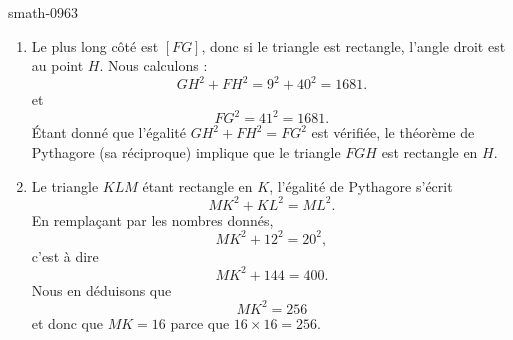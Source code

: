 
\begin{corrige}{smath-0963}

    \begin{enumerate}
        \item
            Le plus long côté est \( [FG]\), donc si le triangle est rectangle, l'angle droit est au point \( H\). Nous calculons :
            \begin{equation}
                GH^2+FH^2=9^2+40^2=1681.
            \end{equation}
            et
            \begin{equation}
                FG^2=41^2=1681.
            \end{equation}
            Étant donné que l'égalité \( GH^2+FH^2=FG^2\) est vérifiée, le théorème de Pythagore (sa réciproque) implique que le triangle \( FGH\) est rectangle en \( H\).
        \item
            Le triangle \( KLM\) étant rectangle en \( K\), l'égalité de Pythagore s'écrit
            \begin{equation}
                MK^2+KL^2=ML^2.
            \end{equation}
            En remplaçant par les nombres donnés,
            \begin{equation}
                MK^2+12^2=20^2,
            \end{equation}
            c'est à dire
            \begin{equation}
                MK^2+144=400.
            \end{equation}
            Nous en déduisons que
            \begin{equation}
                MK^2=256
            \end{equation}
            et donc que \( MK=16\) parce que \( 16\times 16=256\).
    \end{enumerate}

\end{corrige}
